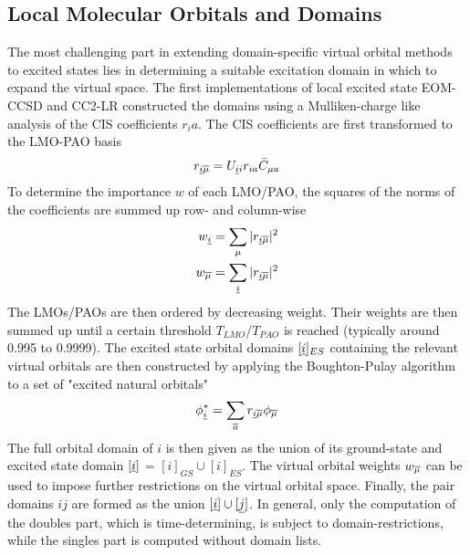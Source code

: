 \subsection{Local Molecular Orbitals and Domains}

The most challenging part in extending domain-specific virtual orbital methods to excited states lies in determining a suitable excitation domain in which to expand the virtual space. The first implementations of local excited state EOM-CCSD \cite{Kor2003,Cra2002} and CC2-LR \cite{Kat2003} constructed the domains using a Mulliken-charge like analysis of the CIS coefficients $r_ia$. The CIS coefficients are first transformed to the LMO-PAO basis
\begin{equation}
r_{\underline{i} \overline{\mu}} = U_{\underline{i} i } r_{ia} \bar{C}_{\mu a} 
\end{equation}
\noindent To determine the importance $w$ of each LMO/PAO, the squares of the norms of the coefficients are summed up row- and column-wise
\begin{equation}
\begin{split}
w_{\underline{i}} &= \sum_{\mu} |r_{\underline{i} \overline{\mu}}|^2 \\
w_{\overline{\mu}} &= \sum_{\underline{i}} |r_{\underline{i} \overline{\mu}}|^2
\end{split}
\end{equation}
\noindent The LMOs/PAOs are then ordered by decreasing weight. Their weights are then summed up until a certain threshold $T_{LMO}$/$T_{PAO}$ is reached (typically around 0.995 to 0.9999). The excited state orbital domains $[\underline{i}]_{ES}$ containing the relevant virtual orbitals are then constructed by applying the Boughton-Pulay algorithm to a set of "excited natural orbitals" \cite{Kor2003}
\begin{equation}
\phi_{\underline{i}}^* = \sum_{\overline{a}} r_{\underline{i} \overline{\mu}} \phi_{\overline{\mu}}  
\end{equation} 
\noindent The full orbital domain of $i$ is then given as the union of its ground-state and excited state domain $[\underline{i}]$ = $[i]_{GS} \cup [i]_{ES}$. The virtual orbital weights $w_{\overline{\mu}}$ can be used to impose further restrictions on the virtual orbital space. Finally, the pair domains $ij$ are formed as the union $[\underline{i}] \cup [\underline{j}]$. In general, only the computation of the doubles part, which is time-determining, is subject to domain-restrictions, while the singles part is computed without domain lists.

